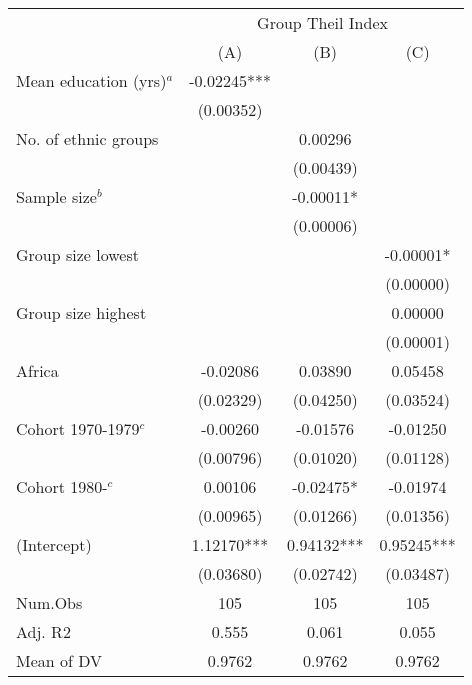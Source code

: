 
\begin{tabular}[t]{lccc}
\toprule
\multicolumn{1}{c}{ } & \multicolumn{3}{c}{Group Theil Index} \\
\cmidrule(l{3pt}r{3pt}){2-4}
  & (A) & (B) & (C)\\
\midrule
Mean education (yrs)$^a$ & -0.02245*** &  & \\
 & (0.00352) &  & \\
No. of ethnic groups &  & 0.00296 & \\
 &  & (0.00439) & \\
Sample size$^b$ &  & -0.00011* & \\
 &  & (0.00006) & \\
Group size lowest &  &  & -0.00001*\\
 &  &  & (0.00000)\\
Group size highest &  &  & 0.00000\\
 &  &  & (0.00001)\\
Africa & -0.02086 & 0.03890 & 0.05458\\
 & (0.02329) & (0.04250) & (0.03524)\\
Cohort 1970-1979$^c$ & -0.00260 & -0.01576 & -0.01250\\
 & (0.00796) & (0.01020) & (0.01128)\\
Cohort 1980-$^c$ & 0.00106 & -0.02475* & -0.01974\\
 & (0.00965) & (0.01266) & (0.01356)\\
(Intercept) & 1.12170*** & 0.94132*** & 0.95245***\\
 & (0.03680) & (0.02742) & (0.03487)\\
\midrule
Num.Obs & 105 & 105 & 105\\
Adj. R2 & 0.555 & 0.061 & 0.055\\
Mean of DV & 0.9762 & 0.9762 & 0.9762\\
\bottomrule
\end{tabular}
